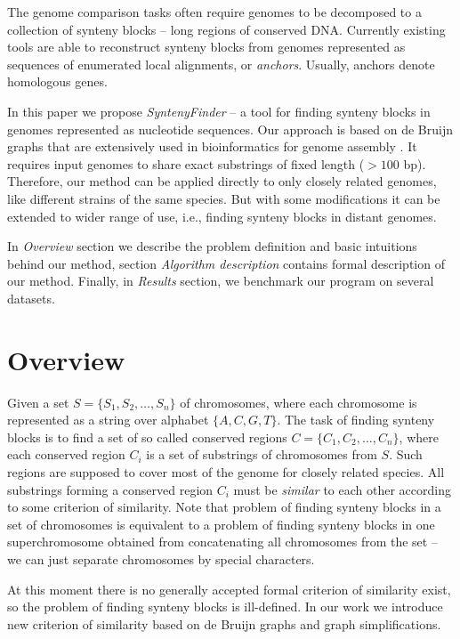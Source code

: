 \documentclass[a4paper, 12pt]{scrartcl}
\begin{document}
The genome comparison tasks often require genomes to be  decomposed to a collection of synteny blocks -- long regions of conserved DNA. Currently existing tools
\cite{Pham2010} are able to reconstruct synteny blocks from genomes represented as sequences of enumerated local alignments, or \textit{anchors}.
Usually, anchors denote homologous genes.

In this paper we propose \textit{SyntenyFinder} -- a tool for finding synteny blocks in genomes represented as nucleotide sequences.
Our approach is based on de Bruijn graphs that are extensively used in bioinformatics for genome assembly \cite{Pevzner2001, Iqbal2012}. 
It requires input genomes to share exact substrings of fixed length (\(> 100\) bp). Therefore, our method can be applied directly to only
closely related genomes, like different strains of the same species. But with some modifications it can be extended to wider range of use, i.e., 
finding synteny blocks in distant genomes.

In \textit{Overview} section we describe the problem definition and basic intuitions behind our method, section \textit{Algorithm description}
contains formal description of our method. Finally, in \textit{Results} section, we benchmark our program on several datasets.

\section{Overview}

Given a set \(S = \lbrace S_{1}, S_{2}, \ldots, S_{n} \rbrace \) of chromosomes, where each
chromosome is represented as a string over alphabet \(\lbrace A, C, G, T \rbrace \). The task of finding synteny
blocks is to find a set of so called conserved regions \(C = \lbrace C_{1}, C_{2}, \ldots , C_{n} \rbrace \), where
each conserved region \(C_{i}\) is a set of substrings of chromosomes from \(S\). Such regions are supposed 
to cover most of the genome for closely related species.  All substrings forming a conserved region \(C_{i}\) must be
\emph{similar} to each other according to some criterion of similarity. Note that problem of finding synteny blocks in a set
of chromosomes is equivalent to a problem of finding synteny blocks in one superchromosome
obtained from concatenating all chromosomes from the set -- we can just separate chromosomes by special characters.

At this moment there is no generally accepted formal criterion of similarity exist, so the problem of finding synteny blocks is ill-defined.
In our work we introduce new criterion of similarity based on de Bruijn graphs and graph simplifications.
\end{document}
